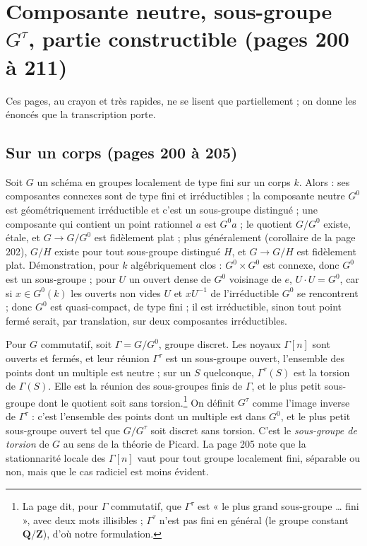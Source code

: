 \documentclass[11pt,a4paper]{article}
\begin{document}
\section*{Composante neutre, sous-groupe $G^\tau$, partie constructible (pages 200 à 211)}

Ces pages, au crayon et très rapides, ne se lisent que partiellement ; on
donne les énoncés que la transcription porte.

\subsection*{Sur un corps (pages 200 à 205)}

Soit $G$ un schéma en groupes localement de type fini sur un corps $k$.
Alors : ses composantes connexes sont de type fini et irréductibles ; la
composante neutre $G^0$ est géométriquement irréductible et c'est un
sous-groupe distingué ; une composante qui contient un point rationnel $a$ est
$G^0 a$ ; le quotient $G/G^0$ existe, étale, et $G \to G/G^0$ est fidèlement
plat ; plus généralement (corollaire de la page 202), $G/H$ existe pour tout
sous-groupe distingué $H$, et $G \to G/H$ est fidèlement plat. Démonstration, pour $k$ algébriquement clos : $G^0 \times G^0$ est connexe,
donc $G^0$ est un sous-groupe ; pour $U$ un ouvert dense de $G^0$ voisinage de
$e$, $U \cdot U = G^0$, car si $x \in G^0(k)$ les ouverts non vides $U$ et
$xU^{-1}$ de l'irréductible $G^0$ se rencontrent ; donc $G^0$ est
quasi-compact, de type fini ; il est irréductible, sinon tout point fermé
serait, par translation, sur deux composantes irréductibles.

Pour $G$ commutatif, soit $\Gamma = G/G^0$, groupe discret. Les noyaux
$\Gamma[n]$ sont ouverts et fermés, et leur réunion $\Gamma^\tau$ est un
sous-groupe ouvert, l'ensemble des points dont un multiple est neutre ; sur un
$S$ quelconque, $\Gamma^\tau(S)$ est la torsion de $\Gamma(S)$. Elle est la
réunion des sous-groupes finis de $\Gamma$, et le plus petit sous-groupe dont
le quotient soit sans torsion.\footnote{La page dit, pour $\Gamma$ commutatif,
que $\Gamma^\tau$ est « le plus grand sous-groupe … fini », avec deux mots
illisibles ; $\Gamma^\tau$ n'est pas fini en général (le groupe constant
$\mathbf{Q}/\mathbf{Z}$), d'où notre formulation.} On définit
$G^\tau$ comme l'image inverse de $\Gamma^\tau$ : c'est l'ensemble des points
dont un multiple est dans $G^0$, et le plus petit sous-groupe ouvert tel que
$G/G^\tau$ soit discret sans torsion. C'est le \emph{sous-groupe de torsion} de
$G$ au sens de la théorie de Picard. La page 205 note que la stationnarité
locale des $\Gamma[n]$ vaut pour tout groupe localement fini, séparable ou non,
mais que le cas radiciel est moins évident.
\end{document}
